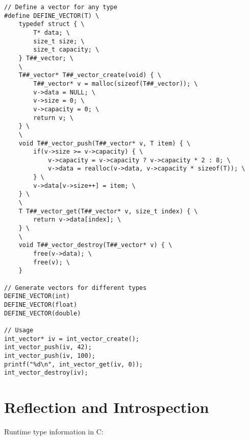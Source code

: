 \begin{lstlisting}
// Define a vector for any type
#define DEFINE_VECTOR(T) \
    typedef struct { \
        T* data; \
        size_t size; \
        size_t capacity; \
    } T##_vector; \
    \
    T##_vector* T##_vector_create(void) { \
        T##_vector* v = malloc(sizeof(T##_vector)); \
        v->data = NULL; \
        v->size = 0; \
        v->capacity = 0; \
        return v; \
    } \
    \
    void T##_vector_push(T##_vector* v, T item) { \
        if(v->size >= v->capacity) { \
            v->capacity = v->capacity ? v->capacity * 2 : 8; \
            v->data = realloc(v->data, v->capacity * sizeof(T)); \
        } \
        v->data[v->size++] = item; \
    } \
    \
    T T##_vector_get(T##_vector* v, size_t index) { \
        return v->data[index]; \
    } \
    \
    void T##_vector_destroy(T##_vector* v) { \
        free(v->data); \
        free(v); \
    }

// Generate vectors for different types
DEFINE_VECTOR(int)
DEFINE_VECTOR(float)
DEFINE_VECTOR(double)

// Usage
int_vector* iv = int_vector_create();
int_vector_push(iv, 42);
int_vector_push(iv, 100);
printf("%d\n", int_vector_get(iv, 0));
int_vector_destroy(iv);
\end{lstlisting}

\section{Reflection and Introspection}

Runtime type information in C:

